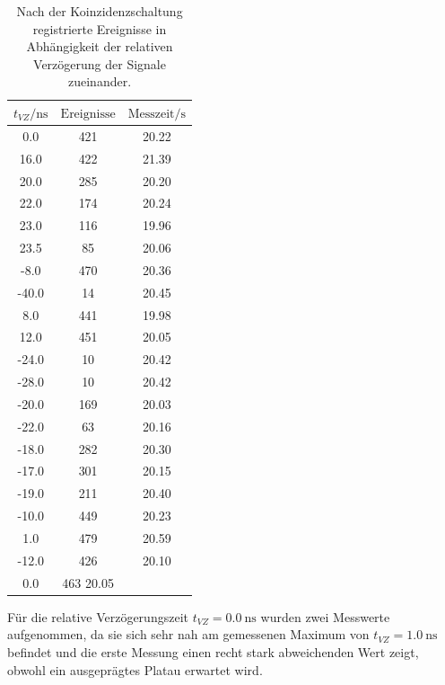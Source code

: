 \begin{table}
  \caption{Nach der Koinzidenzschaltung registrierte Ereignisse in Abhängigkeit der relativen Verzögerung der Signale zueinander.}
  \label{tab:koinzidenz}
  \centering
  \begin{tabular}{|S|S|S|}
    \toprule
    $t_{VZ}/\si{\nano\second}$ & $\text{Ereignisse}$ & $\text{Messzeit}/\si{\second}$ \\
     & 421 & 20.22 \\
    16.0 & 422 & 21.39  \\
    20.0 & 285 & 20.20 \\
    22.0 & 174 & 20.24 \\
    23.0 & 116 & 19.96 \\
    23.5 & 85 & 20.06 \\
    -8.0 & 470 & 20.36 \\
    -40.0 & 14 & 20.45 \\
    8.0 & 441 & 19.98 \\
    12.0 & 451 & 20.05 \\
    -24.0 & 10  & 20.42 \\
    -28.0 & 10 & 20.42 \\
    -20.0 & 169 & 20.03 \\
    -22.0 & 63 & 20.16 \\
    -18.0 & 282 &20.30 \\
    -17.0 & 301 & 20.15 \\
    -19.0 & 211 & 20.40 \\
    -10.0 & 449 & 20.23 \\
    1.0 & 479 & 20.59 \\
    -12.0 & 426 & 20.10 \\
    0.0 & 463 20.05 \\
    \bottomrule
  \end{tabular}
\end{table}

Für die relative Verzögerungszeit $t_{VZ}= \SI{0.0}{\nano\second}$ wurden zwei Messwerte aufgenommen, da sie sich sehr nah am gemessenen Maximum von $t_{VZ}= \SI{1.0}{\nano\second}$ befindet und die erste Messung einen recht stark abweichenden Wert zeigt, obwohl ein ausgeprägtes Platau erwartet wird.


